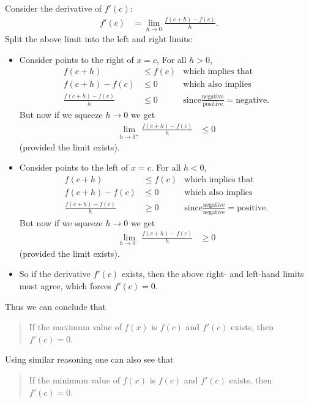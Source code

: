 Consider the derivative of $f'(c)$:
\begin{align*}
f'(c) &= \lim_{h \to 0} \frac{f(c+h)-f(c)}{h}.
\end{align*}
Split the above limit into the left and right limits:
\begin{itemize}
 \item Consider points to the right of $x=c$, For all $h>0$,
\begin{align*}
f(c+h) & \le f(c)  & \text{which implies that} \\
f(c+h)-f(c) &\le 0 & \text{which also implies} \\
\frac{f(c+h)-f(c)}{h} & \le 0 & \text{since
$\frac{\text{negative}}{\text{positive}} = \text{negative}$.}
\end{align*}
But now if we squeeze $h \to 0$ we get
\begin{align*}
  \lim_{h \to 0^+} \frac{f(c+h)-f(c)}{h} &\leq 0
\end{align*}
(provided the limit exists).

\item Consider points to the left of $x=c$. For all $h<0$,
\begin{align*}
f(c+h) & \le f(c)  & \text{which implies that} \\
f(c+h)-f(c) &\le 0 & \text{which also implies} \\
\frac{f(c+h)-f(c)}{h} & \ge 0 & \text{since
$\frac{\text{negative}}{\text{negative}} = \text{positive}$.}
\end{align*}
But now if we squeeze $h \to 0$ we get
\begin{align*}
  \lim_{h \to 0^-} \frac{f(c+h)-f(c)}{h} &\geq 0
\end{align*}
(provided the limit exists).

\item So if the derivative $f'(c)$ exists, then the above right- and left-hand
limits must agree, which forces $f'(c) = 0$.
\end{itemize}
Thus we can conclude that
\begin{quote}
 If the maximum value of $f(x)$ is $f(c)$ and $f'(c)$ exists, then $f'(c)=0$.
\end{quote}
Using similar reasoning one can also see that
\begin{quote}
 If the minimum value of $f(x)$ is $f(c)$ and $f'(c)$ exists, then $f'(c)=0$.
\end{quote}


